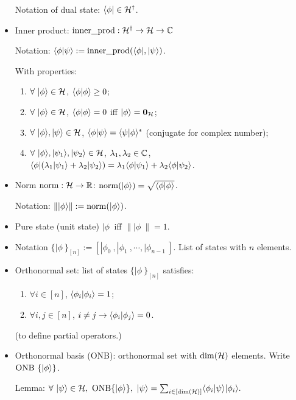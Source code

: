 \begin{itemize}
    Notation of dual state: $\langle\phi|\in{\mathcal{H}}^\dag$.
    
    \item Inner product: ${\operatorname{inner\_prod}}: {\mathcal{H}}^\dag\rightarrow{\mathcal{H}}\rightarrow{\mathbb{C}}$
    
    Notation: $\langle\phi|\psi\rangle := {\operatorname{inner\_prod}}(\langle\phi|,|\psi\rangle)$.
    
    With properties: \begin{enumerate}
        \item $\forall\ |\phi\rangle\in{\mathcal{H}}$, $\langle\phi|\phi\rangle\ge 0$;
        \item $\forall\ |\phi\rangle\in{\mathcal{H}}$, $\langle\phi|\phi\rangle =  0$ iff $|\phi\rangle = {\mathbf{0}_{{\mathcal{H}}}}$;
        \item $\forall\ |\phi\>,|\psi\>\in\cH$, $\langle\phi|\psi\rangle = \langle\psi|\phi\rangle^\ast$ (conjugate for complex number);
        \item $\forall\ |\phi\>,|\psi_1\>,|\psi_2\>\in\cH$, $\lambda_1,\lambda_2\in{\mathbb{C}}$, $\langle\phi|(\lambda_1|\psi_1\rangle+\lambda_2|\psi_2\rangle) = \lambda_1\langle\phi|\psi_1\rangle + \lambda_2\langle\phi|\psi_2\rangle$.
    \end{enumerate}
    
    \item Norm ${\operatorname{norm}}: {\mathcal{H}}\rightarrow{\mathbb{R}}$: ${\operatorname{norm}}(|\phi\rangle) = \sqrt{\langle\phi|\phi\rangle}$. 
    
    Notation: $\| |\phi\rangle \| := {\operatorname{norm}}(|\phi\rangle)$.
    
    \item Pure state (unit state) $|\phi\>$ iff $\||\phi\>\| = 1$.
    \item Notation $\{|\phi\>\}_{[n]} := [|\phi_0\>,|\phi_1\>,\cdots,|\phi_{n-1}\>]$. List of states with $n$ elements.
    \item Orthonormal set: list of states $\{|\phi\>\}_{[n]}$ satisfies: \begin{enumerate}
        \item $\forall i\in[n]$, $\langle\phi_i|\phi_i\rangle = 1$;
        \item $\forall i,j\in[n]$, $i\neq j \rightarrow \langle\phi_i|\phi_j\rangle = 0$.
    \end{enumerate}
    
    (to define partial operators.)
    \item Orthonormal basis (ONB): orthonormal set with $\dim({\mathcal{H}})$ elements. Write ${\operatorname{ONB}}\ \{|\phi\rangle\}$.
    
    Lemma: $\forall\ |\psi\>\in\cH,\ \op{ONB} \{|\phi\>\},\ |\psi\> = \sum_{i\in[\dim(\cH)]} \<\phi_i|\psi\>|\phi_i\>.$
    

\end{itemize}
